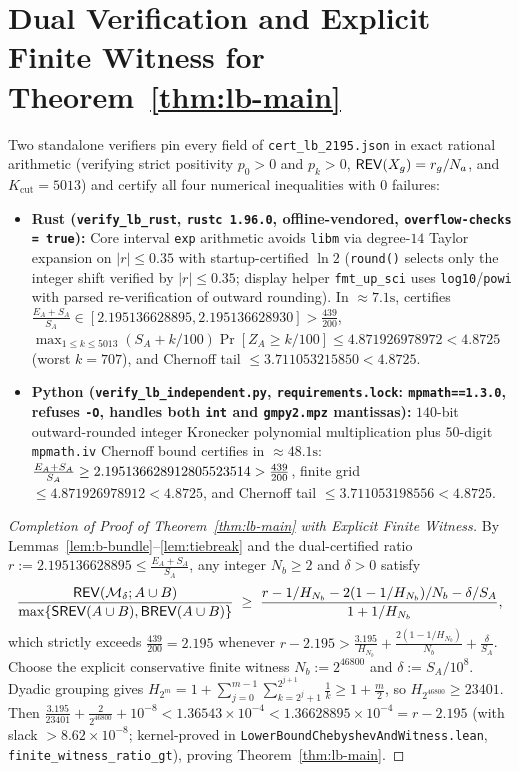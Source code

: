 \section{Dual Verification and Explicit Finite Witness for Theorem~\texorpdfstring{\ref{thm:lb-main}}{1.2}}\label{sec:lb-cert}

Two standalone verifiers pin every field of \texttt{cert\_lb\_2195.json} in exact rational arithmetic (verifying strict positivity $p_0 > 0$ and $p_k > 0$, $\mathsf{REV}(X_g) = r_g/N_a$, and $K_{\mathrm{cut}} = 5013$) and certify all four numerical inequalities with $0$ failures:
\begin{itemize}
  \item \textbf{Rust (\texttt{verify\_lb\_rust}, \texttt{rustc 1.96.0}, offline-vendored, \texttt{overflow-checks = true}):} Core interval \texttt{exp} arithmetic avoids \texttt{libm} via degree-$14$ Taylor expansion on $|r| \le 0.35$ with startup-certified $\ln 2$ (\texttt{round()} selects only the integer shift verified by $|r| \le 0.35$; display helper \texttt{fmt\_up\_sci} uses \texttt{log10}/\texttt{powi} with parsed re-verification of outward rounding). In $\approx 7.1\text{s}$, certifies $\frac{E_A+S_A}{S_A} \in [2.195136628895, 2.195136628930] > \frac{439}{200}$, $\max_{1\le k\le 5013}(S_A+k/100)\Pr[Z_A \ge k/100] \le 4.871926978972 < 4.8725$ (worst $k=707$), and Chernoff tail $\le 3.711053215850 < 4.8725$.
  \item \textbf{Python (\texttt{verify\_lb\_independent.py}, \texttt{requirements.lock}: \texttt{mpmath==1.3.0}, refuses \texttt{-O}, handles both \texttt{int} and \texttt{gmpy2.mpz} mantissas):} $140$-bit outward-rounded integer Kronecker polynomial multiplication plus $50$-digit \texttt{mpmath.iv} Chernoff bound certifies in $\approx 48.1\text{s}$: $\frac{E_A+S_A}{S_A} \ge 2.195136628912805523514 > \frac{439}{200}$, finite grid $\le 4.871926978912 < 4.8725$, and Chernoff tail $\le 3.711053198556 < 4.8725$.
\end{itemize}

\begin{proof}[Completion of Proof of Theorem~\ref{thm:lb-main} with Explicit Finite Witness]
By Lemmas~\ref{lem:b-bundle}--\ref{lem:tiebreak} and the dual-certified ratio $r := 2.195136628895 \le \frac{E_A + S_A}{S_A}$, any integer $N_b \ge 2$ and $\delta > 0$ satisfy
\[
  \frac{\mathsf{REV}(\mathcal{M}_\delta; A\cup B)}{\max\{\mathsf{SREV}(A\cup B), \mathsf{BREV}(A\cup B)\}}
  \;\ge\; \frac{r - 1/H_{N_b} - 2(1 - 1/H_{N_b})/N_b - \delta/S_A}{1 + 1/H_{N_b}},
\]
which strictly exceeds $\frac{439}{200} = 2.195$ whenever $r - 2.195 > \frac{3.195}{H_{N_b}} + \frac{2(1 - 1/H_{N_b})}{N_b} + \frac{\delta}{S_A}$. Choose the explicit conservative finite witness $N_b := 2^{46800}$ and $\delta := S_A / 10^8$. Dyadic grouping gives $H_{2^m} = 1 + \sum_{j=0}^{m-1}\sum_{k=2^j+1}^{2^{j+1}}\frac{1}{k} \ge 1 + \frac{m}{2}$, so $H_{2^{46800}} \ge 23401$. Then $\frac{3.195}{23401} + \frac{2}{2^{46800}} + 10^{-8} < 1.36543 \times 10^{-4} < 1.36628895 \times 10^{-4} = r - 2.195$ (with slack $> 8.62 \times 10^{-8}$; kernel-proved in \texttt{LowerBoundChebyshevAndWitness.lean}, \texttt{finite\_witness\_ratio\_gt}), proving Theorem~\ref{thm:lb-main}.
\end{proof}

